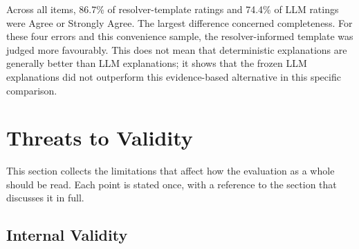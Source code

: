 Across all items, 86.7\% of resolver-template ratings and 74.4\% of LLM
ratings were Agree or Strongly Agree. The largest difference concerned
completeness. For these four errors and this convenience sample, the
resolver-informed template was judged more favourably. This does not mean that
deterministic explanations are generally better than LLM explanations; it shows
that the frozen LLM explanations did not outperform this evidence-based
alternative in this specific comparison.

\iffalse
\section{Threats to Validity}

This section collects the limitations that affect how the evaluation as a
whole should be read. Each point is stated once, with a reference to the
section that discusses it in full.

\subsection{Internal Validity}
\label{sec:v-threats-internal}

